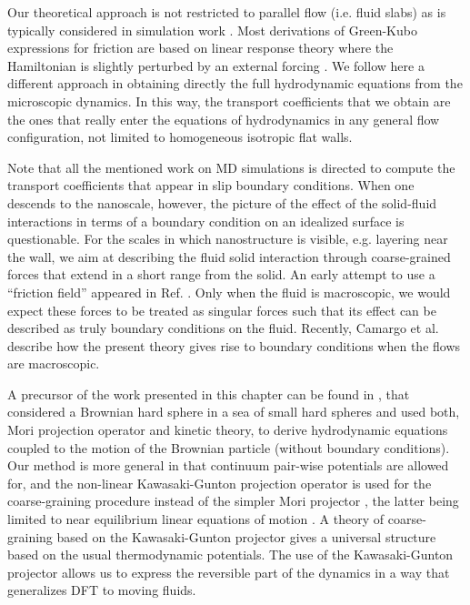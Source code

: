 \documentclass[b5paper,openright,11pt]{book}
\begin{document}
Our  theoretical approach  is not  restricted to  parallel flow  (i.e.
fluid   slabs)  as   is  typically   considered  in   simulation  work
\cite{Bocquet1994,Petravic2007,Hansen2011,Kannam2011,Ramos-Alvarado2016}.
Most derivations of  Green-Kubo expressions for friction  are based on
linear response theory where the  Hamiltonian is slightly perturbed by
an external  forcing \cite{Bocquet1994,Huang2014}.   We follow  here a
different  approach  in  obtaining   directly  the  full  hydrodynamic
equations from the  microscopic dynamics.  In this  way, the transport
coefficients  that  we obtain  are  the  ones  that really  enter  the
equations  of hydrodynamics  in  any general  flow configuration,  not
limited to homogeneous isotropic flat walls.

Note that  all the  mentioned work  on MD  simulations is  directed to
compute  the  transport  coefficients  that appear  in  slip  boundary
conditions.  When one descends to  the nanoscale, however, the picture
of the effect  of the solid-fluid interactions in terms  of a boundary
condition on an idealized surface  is questionable.  For the scales in
which nanostructure is  visible, e.g.  layering near the  wall, we aim
at  describing  the  fluid solid  interaction  through  coarse-grained
forces that extend  in a short range from the  solid. An early attempt
to use a ``friction field''  appeared in Ref. \cite{Sokhan2002}.
Only when the  fluid is  macroscopic, we  would expect  these forces  to be
treated as  singular forces such that  its effect can be  described as
truly boundary  conditions on  the fluid. Recently, Camargo et al. \cite{CamargoBC2018} describe how the present theory gives rise to boundary conditions when the flows are macroscopic.

A precursor of the work presented in this chapter can be found in \cite{Cukier1980},  that considered a Brownian
hard  sphere in  a  sea of  small  hard spheres  and  used both,  Mori
projection  operator  and  kinetic   theory,  to  derive  hydrodynamic
equations  coupled to  the motion  of the  Brownian particle  (without
boundary conditions).   Our method is  more general in  that continuum
pair-wise   potentials   are   allowed   for,   and   the   non-linear
Kawasaki-Gunton  projection operator  \cite{Kawasaki1973a} is  used for
the   coarse-graining   procedure   instead  of   the   simpler   Mori
projector \cite{Huang2014},   the   latter   being  limited   to   near
equilibrium linear  equations of motion \cite{Grabert1982}.   A theory
of  coarse-graining based  on  the Kawasaki-Gunton  projector gives  a
universal structure based on  the usual thermodynamic potentials.  The
use  of  the  Kawasaki-Gunton  projector  allows  us  to  express  the
reversible  part of  the dynamics  in a  way that  generalizes DFT to moving fluids.
\end{document}
